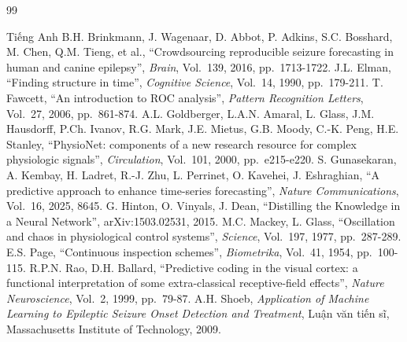 %

\begin{thebibliography}{99}

\begin{bibsection}{Tiếng Anh}
	B.H. Brinkmann, J. Wagenaar, D. Abbot, P. Adkins, S.C. Bosshard, M. Chen, Q.M. Tieng, et al.,
	``Crowdsourcing reproducible seizure forecasting in human and canine epilepsy'',
	\textit{Brain}, Vol.~139, 2016, pp.~1713-1722.
	J.L. Elman,
	``Finding structure in time'',
	\textit{Cognitive Science}, Vol.~14, 1990, pp.~179-211.
	T. Fawcett,
	``An introduction to ROC analysis'',
	\textit{Pattern Recognition Letters}, Vol.~27, 2006, pp.~861-874.
	A.L. Goldberger, L.A.N. Amaral, L. Glass, J.M. Hausdorff, P.Ch. Ivanov, R.G. Mark, J.E. Mietus, G.B. Moody, C.-K. Peng, H.E. Stanley,
	``PhysioNet: components of a new research resource for complex physiologic signals'',
	\textit{Circulation}, Vol.~101, 2000, pp.~e215-e220.
	S. Gunasekaran, A. Kembay, H. Ladret, R.-J. Zhu, L. Perrinet, O. Kavehei, J. Eshraghian,
	``A predictive approach to enhance time-series forecasting'',
	\textit{Nature Communications}, Vol.~16, 2025, 8645.
	G. Hinton, O. Vinyals, J. Dean,
	``Distilling the Knowledge in a Neural Network'',
	arXiv:1503.02531, 2015.
	M.C. Mackey, L. Glass,
	``Oscillation and chaos in physiological control systems'',
	\textit{Science}, Vol.~197, 1977, pp.~287-289.
	E.S. Page,
	``Continuous inspection schemes'',
	\textit{Biometrika}, Vol.~41, 1954, pp.~100-115.
	R.P.N. Rao, D.H. Ballard,
	``Predictive coding in the visual cortex: a functional interpretation of some extra-classical receptive-field effects'',
	\textit{Nature Neuroscience}, Vol.~2, 1999, pp.~79-87.
	A.H. Shoeb,
	\textit{Application of Machine Learning to Epileptic Seizure Onset Detection and Treatment},
	Luận văn tiến sĩ, Massachusetts Institute of Technology, 2009.
\end{bibsection}
\end{thebibliography}
